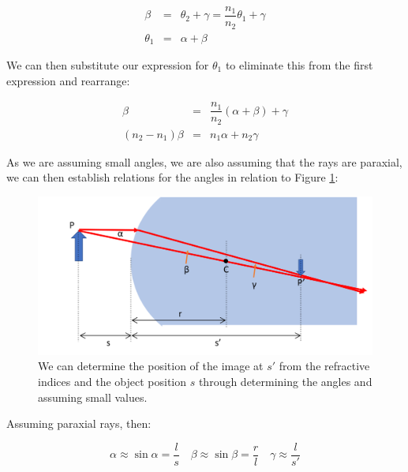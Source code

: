 \documentclass[
]{book}
\begin{document}
\begin{equation}
\begin{array}{rcl}
\beta &=& \theta_2 + \gamma = \dfrac{n_1}{n_2}\theta_1 + \gamma \\
\theta_1 &=& \alpha + \beta
\end{array}
\label{eq:ch16-lensequation2}
\end{equation}

We can then substitute our expression for \(\theta_1\) to eliminate this from the first expression and rearrange:

\begin{equation}
\begin{array}{rcl}
\beta &=& \dfrac{n_1}{n_2}(\alpha + \beta) + \gamma \\
(n_2 -n_1)\beta &=& n_1 \alpha + n_2 \gamma
\end{array}
\label{eq:ch16-lensequation3}
\end{equation}

As we are assuming small angles, we are also assuming that the rays are paraxial, we can then establish relations for the angles in relation to Figure \ref{fig:ch16-sphericalsurface2}:

\begin{figure}

{\centering \includegraphics[width=0.7\linewidth]{visualisations/LaTeX/ch16-sphericalsurfacedims} 

}

\caption{We can determine the position of the image at $s'$ from the refractive indices and the object position $s$ through determining the angles and assuming small values.}\label{fig:ch16-sphericalsurface2}
\end{figure}

Assuming paraxial rays, then:

\begin{equation}
\alpha \approx \sin \alpha = \frac{l}{s} \quad \beta \approx \sin \beta = \frac{r}{l} \quad \gamma \approx \frac{l}{s'}
\label{eq:ch16-lensequation4}
\end{equation}
\end{document}
